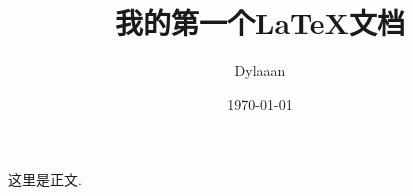 \documentclass[12pt, a4paper, oneside]{ctexart}
\title{我的第一个\LaTeX 文档}
\author{Dylaaan}
\date{\today}
\begin{document}
\maketitle

这里是正文. 
\end{document}
